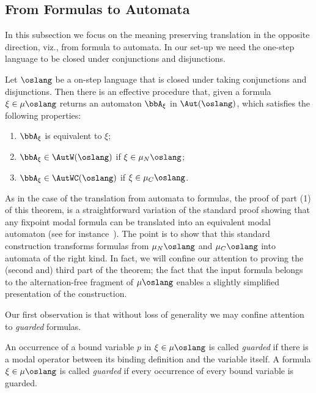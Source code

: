 \subsection{From Formulas to Automata}
   \label{sec:mc-to-parity}

In this subsection we focus on the meaning preserving translation in the
opposite direction, viz., from formula to automata.
In our set-up we need the one-step language to be closed under conjunctions and
disjunctions.

\begin{theorem}\label{t:fortoaut}
Let $\oslang$ be a on-step language that is closed under taking conjunctions and 
disjunctions.
Then there is an effective procedure that, given a formula $\xi \in \mu\oslang$
returns an automaton $\bbA_{\xi}$ in $\Aut(\oslang)$, which satisfies the 
following properties:
\begin{enumerate}[(1)]
\item $\bbA_\xi$ is equivalent to $\xi$;
\item  $\bbA_\xi \in \AutW(\oslang)$ if $\xi \in \mu_{N}\oslang$;
\item  $\bbA_\xi \in \AutWC(\oslang)$ if $\xi \in \mu_{C}\oslang$.
\end{enumerate}
\end{theorem}

As in the case of the translation from automata to formulas, the proof of part
(1) of this theorem, is a straightforward variation of the standard proof showing
that any fixpoint modal formula can be translated into an equivalent modal 
automaton (see for instance~\cite[Section 6]{Ven08}). 
The point is to show that this standard construction transforms formulas from 
$\mu_{N}\oslang$ and $\mu_{C}\oslang$ into automata of the right kind.
In fact, we will confine our attention to proving the (second and) third part
of the theorem; the fact that the input formula belongs to the alternation-free
fragment of $\mu\oslang$ enables a slightly simplified presentation of the 
construction.

Our first observation is that without loss of generality we may confine 
attention to \emph{guarded} formulas.

\begin{definition}
An occurrence of a bound variable $p$ in $\xi  \in \mu\oslang$ is called 
\emph{guarded} if there is a modal operator between its binding definition and 
the variable itself. 
A formula $\xi  \in \mu\oslang$ is called \emph{guarded} if every occurrence of
every bound variable is guarded.
\end{definition}

